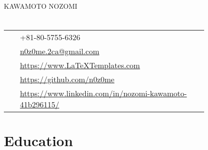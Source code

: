 \documentclass[10pt]{article} %
\begin{document}

\parbox[top][0.12\textheight][c]{\linewidth}{ %
	\vspace{-0.04\textheight} %
	{\Helvetica\Huge KAWAMOTO NOZOMI}\\\medskip %
}

\begin{paracol}{2} %


\section{}
\parbox[top][0.12\textheight][c]{\linewidth}{ %
	\vspace{-0.04\textheight} %
	\colorbox{shade}{ %
		\begin{supertabular}{p{0.05\linewidth}|p{0.775\linewidth}} %
			\raisebox{-1pt}{\faPhone} & +81-80-5755-6326 \\ %
			\raisebox{0pt}{\small\faEnvelope} & \href{mailto:n0z0me.2ca@gmail.com}{n0z0me.2ca@gmail.com} \\ %
			\raisebox{-1pt}{\small\faDesktop} & \href{https://www.LaTeXTemplates.com}{https://www.LaTeXTemplates.com} \\ %
			\raisebox{-1pt}{\faGithub} & \href{https://github.com/n0z0me}{https://github.com/n0z0me} \\ %
			\raisebox{-1pt}{\faLinkedinSquare} & \href{https://www.linkedin.com/in/nozomi-kawamoto-41b296115/}{https://www.linkedin.com/in/nozomi-kawamoto-41b296115/} \\ %
		\end{supertabular}
	}
}

\section{Education}

\end{paracol}
\end{document}
